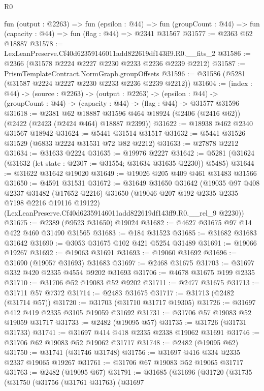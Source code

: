 \begin{lexlean}{R0}
\begin{coremodule}
  fun (output : @2263) =>
  fun (epsilon : @44) =>
  fun (groupCount : @44) => fun (capacity : @44) => fun (flag : @44) => @2341 @31567
@31577 := @2363 @62 @18887
@31578 := LexLeanPreserve.Cf40d62359146011add822619df143ff9.R0.__fits_2
@31586 := @2366 (@31578 @2224 @2227 @2230 @2233 @2236 @2239 @2212)
@31587 := PrismTemplateContract.NormGraph.groupOffsets
@31596 := @31586 (@5281 (@31587 @2224 @2227 @2230 @2233 @2236 @2239 @2212))
@31604 := (index : @44) ->
  (source : @2263) ->
  (output : @2263) ->
  (epsilon : @44) -> (groupCount : @44) -> (capacity : @44) -> (flag : @44) -> @31577 @31596
@31618 := @2381
    @62
    @18887
    @31596
    @464
    @18924
    (@2406 (@2416 @62))
    (@2422 (@2423 (@2424 @464) @18887 @2399))
@31622 := @18938 @462 @2340 @31567 @18942
@31624 := @5441 @31514 @31517
@31632 := @5441 @31526 @31529 (@6833 @2224 @31531 @72 @82 @2212)
@31633 := @27878 @2212
@31634 := @31633 @2224
@31635 := @19976 @2227
@31642 := @5281 (@31624 (@31632 (let state : @2307 := @31554; @31634 @31635 @2230)) @5485)
@31644 := @31622 @31642 @19020
@31649 := @19026 @205 @409 @461 @31483 @31566
@31650 := @4591 @31531
@31672 := @31649
    @31650
    @31642
    (@19035
      @97
      @408
      @2337
      @31482
      (@17652 @2216)
      @31650
      (@19046 @207 @192 @2335 @2335 @7198 @2216 @19116 @19122)
      (LexLeanPreserve.Cf40d62359146011add822619df143ff9.R0.__rel_9 @2230))
@31675 := @2389 (@9523 @31650) @19024
@31682 := @4627 @31675 @97 @14 @422 @460 @31490 @31565
@31683 := @184 @31523
@31685 := @31682 @31683 @31642
@31690 := @3053 @31675 @102 @421 @5254 @31489
@31691 := @19066 @19267
@31692 := @19063 @31691
@31693 := @19060 @31692
@31696 := @31690 (@19057 @31693) @31683
@31697 := @2468 @31675
@31703 := @31697 @332 @420 @2335 @4554 @9202 @31693
@31706 := @4678 @31675 @199 @2335
@31710 := @31706 @52 @19083 @52 @9202
@31711 := @2477 @31675
@31713 := @31711 @57 @7372
@31714 := @2483 @31675
@31717 := @31713 (@2482 (@31714 @57))
@31720 := @31703 (@31710 @31717 @19305)
@31726 := @31697 @412 @419 @2335 @3105 @19059 @31692
@31731 := @31706 @57 @19083 @52 @19059 @31717
@31733 := @2482 (@19095 @57)
@31735 := @31726 (@31731 @31733)
@31741 := @31697 @414 @418 @2335 @2338 @19062 @31691
@31746 := @31706 @62 @19083 @52 @19062 @31717
@31748 := @2482 (@19095 @62)
@31750 := @31741 (@31746 @31748)
@31756 := @31697 @416 @334 @2335 @2337 @19065 @19267
@31761 := @31706 @67 @19083 @52 @19065 @31717
@31763 := @2482 (@19095 @67)
@31791 := @31685
    (@31696
      (@31720
        (@31735
          (@31750
            (@31756
              (@31761 @31763)
              (@31697

\end{coremodule}
\end{lexlean}
